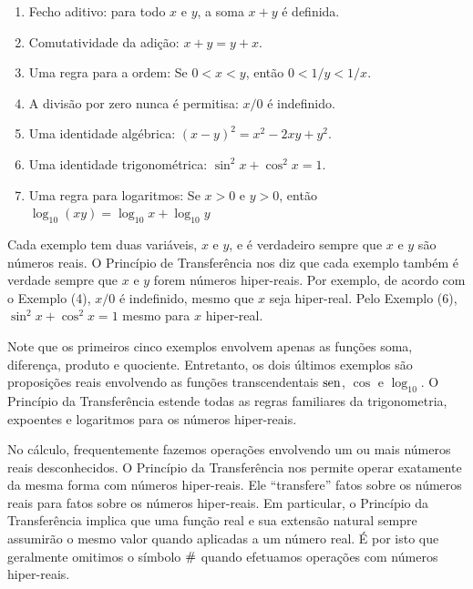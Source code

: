 \begin{enumerate}[(1)]
\item Fecho aditivo: para todo $x$ e $y$, a soma $x+y$ é definida.
\item Comutatividade da adição: $x + y = y + x$.
\item Uma regra para a ordem: Se $0 < x < y$, então $0 < 1/y < 1/x$.
\item A divisão por zero nunca é permitisa: $x/0$ é indefinido.
\item Uma identidade algébrica: $(x-y)^2 = x^2 - 2xy + y^2$.
\item Uma identidade trigonométrica: $\sin^2 x + \cos^2 x = 1$.
\item Uma regra para logaritmos: Se $x > 0$ e $y > 0$, então $\log_{10}(xy) =
      \log_{10} x + \log_{10} y$
\end{enumerate}

Cada exemplo tem duas variáveis, $x$ e $y$, e é verdadeiro sempre que $x$ e
$y$ são números reais. O Princípio de Transferência nos diz que cada exemplo
também é verdade sempre que $x$ e $y$ forem números hiper-reais. Por exemplo,
de acordo com o Exemplo (4), $x/0$ é indefinido, mesmo que $x$ seja
hiper-real. Pelo Exemplo (6), $\sin^2 x + \cos^2 x = 1$ mesmo para $x$
hiper-real.

Note que os primeiros cinco exemplos envolvem apenas as funções soma,
diferença, produto e quociente. Entretanto, os dois últimos exemplos
são proposições reais envolvendo as funções transcendentais $\operatorname{sen}$,
$\cos$ e $\log_{10}$. O Princípio da Transferência estende todas
as regras familiares da trigonometria, expoentes e logaritmos para os
números hiper-reais.

No cálculo, frequentemente fazemos operações envolvendo um ou mais
números reais desconhecidos. O Princípio da Transferência nos permite
operar exatamente da mesma forma com números hiper-reais. Ele ``transfere''
fatos sobre os números reais para fatos sobre os números hiper-reais. Em
particular, o Princípio da Transferência implica que uma função real e sua
extensão natural sempre assumirão o mesmo valor quando aplicadas a um número
real. É por isto que geralmente omitimos o símbolo $\#$ quando
efetuamos operações com números hiper-reais.

